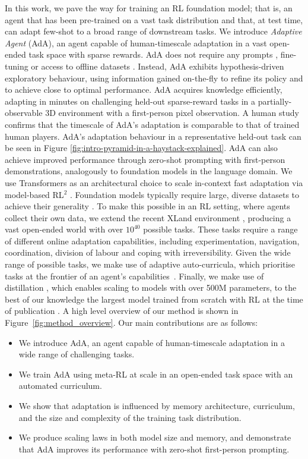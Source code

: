 \documentclass[11pt, a4paper, logo, copyright]{deepmind}
\begin{document}
In this work, we pave the way for training an RL foundation model; that is, an agent that has been pre-trained on a vast task distribution and that, at test time, can adapt few-shot to a broad range of downstream tasks. We introduce \emph{Adaptive Agent} (AdA), an agent capable of human-timescale adaptation in a vast open-ended task space with sparse rewards. AdA does not require any prompts \citep{reed2022a}, fine-tuning \citep{lee2022multigame} or access to offline datasets \citep{laskin2022algorithmdistillation, reed2022a}. Instead, AdA exhibits hypothesis-driven exploratory behaviour, using information gained on-the-fly to refine its policy and to achieve close to optimal performance. AdA acquires knowledge efficiently, adapting in minutes on challenging held-out sparse-reward tasks in a partially-observable 3D environment with a first-person pixel observation. A human study confirms that the timescale of AdA's adaptation is comparable to that of trained human players. AdA's adaptation behaviour in a representative held-out task can be seen in Figure \ref{fig:intro-pyramid-in-a-haystack-explained}. AdA can also achieve improved performance through zero-shot prompting with first-person demonstrations, analogously to foundation models in the language domain.
We use Transformers as an architectural choice to scale in-context fast adaptation via model-based RL${^2}$ \citep{duan2017rl, wang2016learning, melo2022transformers}. Foundation models typically require large, diverse datasets to achieve their generality \citep{8237359, mahajan2018, brown2020gpt3, 9880094, schuhmann2022laionb}. To make this possible in an RL setting, where agents collect their own data, we extend the recent XLand environment \citep{xland}, producing a vast open-ended world with over $10^{40}$ possible tasks. These tasks require a range of different online adaptation capabilities, including experimentation, navigation, coordination, division of labour and coping with irreversibility. Given the wide range of possible tasks, we make use of adaptive auto-curricula, which prioritise tasks at the frontier of an agent's capabilities~\citep{xland, jiang2021robustplr}. Finally, we make use of distillation \citep{schmitt2018kickstarting}, which enables scaling to models with over 500M parameters, to the best of our knowledge the largest model trained from scratch with RL at the time of publication \citep{https://doi.org/10.48550/arxiv.2102.07920}. A high level overview of our method is shown in Figure~\ref{fig:method_overview}.
Our main contributions are as follows:
\begin{itemize}
    \item We introduce AdA, an agent capable of human-timescale adaptation in a wide range of challenging tasks.
    \item We train AdA using meta-RL at scale in an open-ended task space with an automated curriculum.
    \item We show that adaptation is
    influenced by memory architecture, curriculum, and the size and complexity of the training task distribution.
    \item We produce scaling laws in both model size and memory, and demonstrate that AdA improves its performance with zero-shot first-person prompting.
\end{itemize}
\end{document}
